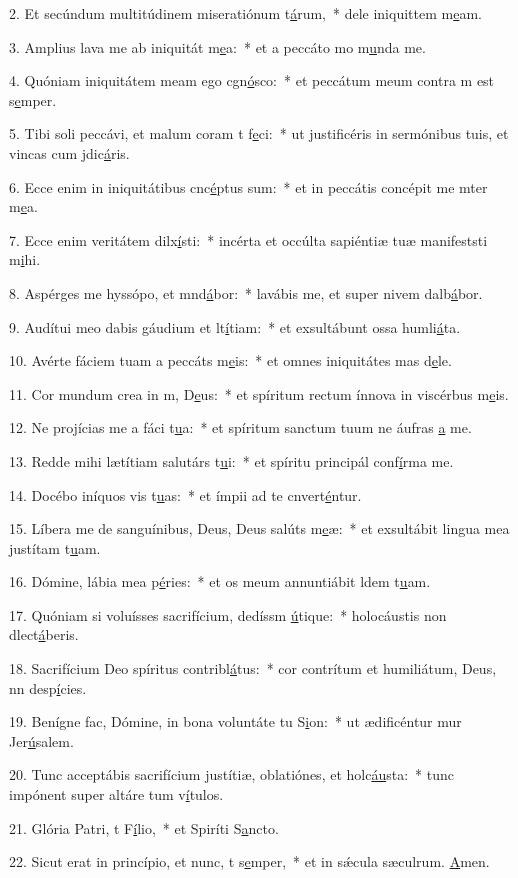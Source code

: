 2. Et secúndum multitúdinem miseratiónum t\uline{á}rum,~* dele iniquittem m\uline{e}am.\par 
3. Amplius lava me ab iniquitát m\uline{e}a:~* et a peccáto mo m\uline{u}nda me.\par 
4. Quóniam iniquitátem meam ego cgn\uline{ó}sco:~* et peccátum meum contra m est s\uline{e}mper.\par 
5. Tibi soli peccávi, et malum coram t f\uline{e}ci:~* ut justificéris in sermónibus tuis, et vincas cum jdic\uline{á}ris.\par 
6. Ecce enim in iniquitátibus cnc\uline{é}ptus sum:~* et in peccátis concépit me mter m\uline{e}a.\par 
7. Ecce enim veritátem dilx\uline{í}sti:~* incérta et occúlta sapiéntiæ tuæ manifeststi m\uline{i}hi.\par 
8. Aspérges me hyssópo, et mnd\uline{á}bor:~* lavábis me, et super nivem dalb\uline{á}bor.\par 
9. Audítui meo dabis gáudium et lt\uline{í}tiam:~* et exsultábunt ossa humli\uline{á}ta.\par 
10. Avérte fáciem tuam a peccáts m\uline{e}is:~* et omnes iniquitátes mas d\uline{e}le.\par 
11. Cor mundum crea in m, D\uline{e}us:~* et spíritum rectum ínnova in viscérbus m\uline{e}is.\par 
12. Ne projícias me a fáci t\uline{u}a:~* et spíritum sanctum tuum ne áufras \uline{a} me.\par 
13. Redde mihi lætítiam salutárs t\uline{u}i:~* et spíritu principál conf\uline{í}rma me.\par 
14. Docébo iníquos vis t\uline{u}as:~* et ímpii ad te cnvert\uline{é}ntur.\par 
15. Líbera me de sanguínibus, Deus, Deus salúts m\uline{e}æ:~* et exsultábit lingua mea justítam t\uline{u}am.\par 
16. Dómine, lábia mea p\uline{é}ries:~* et os meum annuntiábit ldem t\uline{u}am.\par 
17. Quóniam si voluísses sacrifícium, dedíssm \uline{ú}tique:~* holocáustis non dlect\uline{á}beris.\par 
18. Sacrifícium Deo spíritus contribl\uline{á}tus:~* cor contrítum et humiliátum, Deus, nn desp\uline{í}cies.\par 
19. Benígne fac, Dómine, in bona voluntáte tu S\uline{i}on:~* ut ædificéntur mur Jer\uline{ú}salem.\par 
20. Tunc acceptábis sacrifícium justítiæ, oblatiónes, et holc\uline{áu}sta:~* tunc impónent super altáre tum v\uline{í}tulos.\par 
21. Glória Patri, t F\uline{í}lio,~* et Spiríti S\uline{a}ncto.\par 
22. Sicut erat in princípio, et nunc, t s\uline{e}mper,~* et in sǽcula sæculrum. \uline{A}men.\par 
